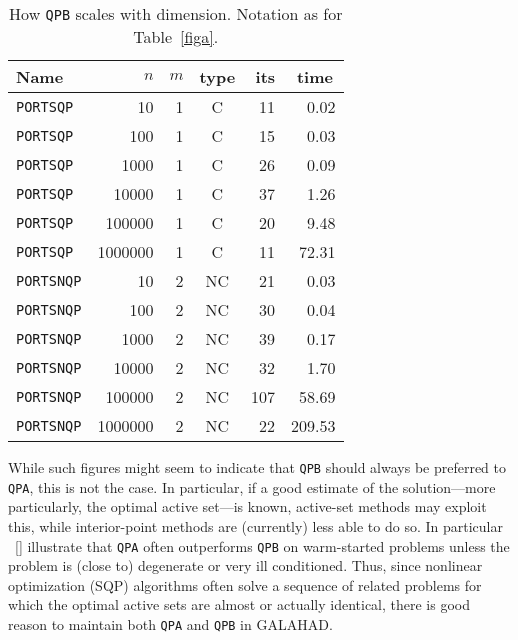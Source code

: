 \documentclass[acmtocl,acmnow]{acmtrans2m}
\newcommand{\gal}{{\sf GALAHAD}}
\newcommand{\citebb}[1]{\citeauthor{#1}\ [\citeyear{#1}]}
\begin{document}
\begin{table}[htb]
\begin{center}
\begin{tabular}[c]{|lrrc|rr|}
\hline
Name      & $n$ & $m$ & type & its & time\, \\
\hline
{\tt PORTSQP}  & 10 & 1  & C & 11    & {0.02} \\
{\tt PORTSQP}  & 100 & 1  & C &  15   & {0.03} \\
{\tt PORTSQP}  & 1000 & 1  & C &  26   & {0.09} \\
{\tt PORTSQP}  & 10000 & 1  & C &  37   & {1.26} \\
{\tt PORTSQP}  & 100000 & 1  & C &  20   & {9.48} \\
{\tt PORTSQP}  & 1000000 & 1  & C &  11   & {72.31} \\
\hline
{\tt PORTSNQP}  & 10 & 2  & NC & 21    & {0.03} \\
{\tt PORTSNQP}  & 100 & 2  & NC &  30   & {0.04} \\
{\tt PORTSNQP}  & 1000 & 2  & NC &  39   & {0.17} \\
{\tt PORTSNQP}  & 10000 & 2  & NC &  32   & {1.70} \\
{\tt PORTSNQP}  & 100000 & 2  & NC &  107   & { 58.69} \\
{\tt PORTSNQP}  & 1000000 & 2  & NC &  22   & {209.53} \\
\hline
\end{tabular}
\end{center}
\caption{\label{figb} How {\tt QPB} scales with dimension.
Notation as for Table~\ref{figa}.}
\end{table}

While such figures might seem to indicate that {\tt QPB} should always
be preferred to {\tt QPA}, this is not the case. In particular, if a
good estimate of the solution---more particularly, the optimal active
set---is known, active-set methods may exploit this,
while interior-point methods
are (currently) less able to do so. In particular
\citebb{GoulToin01c} illustrate that {\tt QPA} often outperforms {\tt QPB}
on warm-started problems unless the problem is (close to) degenerate or
very ill conditioned. Thus, since nonlinear optimization (SQP) algorithms
often solve a sequence of related problems for which the optimal active sets
are almost or actually identical, there is good reason to maintain both
{\tt QPA} and {\tt QPB} in \gal.
\end{document}
